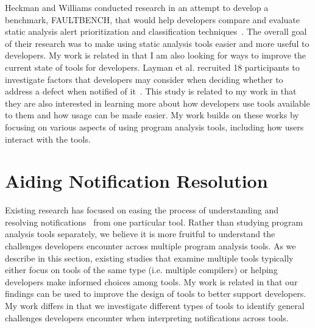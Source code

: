 
Heckman and Williams conducted research in an attempt to develop a benchmark,
FAULTBENCH, that would help developers compare and evaluate static analysis
alert prioritization and classification techniques~\cite{Heckman:2008:Faultbench}. 
The overall goal of their research was to make using static analysis tools easier and more useful to developers.
My work is related in that I am also looking for ways to improve the current state of tools for developers. 
Layman et al. recruited 18 participants to investigate factors that developers may consider when deciding whether to
address a defect when notified of it~\cite{Layman:2007:FaultFix}. This study
is related to my work in that they are also interested in learning more about how developers use tools available to them 
and how usage can be made easier.  My work builds on these works by focusing on various
aspects of using program analysis tools, including how users interact with the
tools.

\section{Aiding Notification Resolution}

Existing research has focused on easing the process of understanding and resolving notifications~\cite{Hartmann:2010:Suggestions,Mucslu:2012:Speculative,pham2015automatically,fritz2014developers} from one particular tool.
Rather than studying program analysis tools separately, we believe it is more fruitful to understand the challenges developers encounter across multiple program analysis tools.
As we describe in this section,
existing studies that examine multiple tools typically either focus on tools of the same type (i.e. multiple compilers) 
or helping developers make informed choices among tools. 
My work is related in that our findings can be used to improve the design of tools to better support developers.
My work differs in that we investigate different types of tools to identify general challenges developers encounter when interpreting notifications across tools. 

